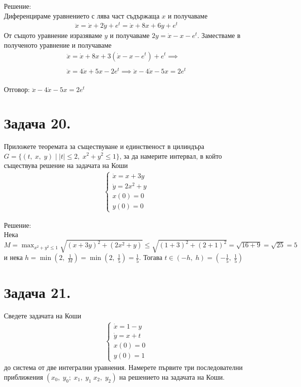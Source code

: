 \documentclass[a4paper, 12pt, oneside]{article}
\begin{document}
Решение: \\

Диференцираме уравнението с лява част съдържаща $x$ и получаваме
\begin{align*}
    \ddot{x} = \dot{x} + 2\dot{y} + e^t
    = \dot{x} + 8x + 6y + e^t
\end{align*}
От същото уравнение изразяваме $y$ и получаваме $2y = \dot{x} -x - e^t$.
Заместваме в полученото уравнение и получаваме
\begin{align*}
    \ddot{x} = \dot{x} + 8x + 3(\dot{x} -x - e^t) + e^t \implies \\\\
    \ddot{x} = 4\dot{x} + 5x - 2e^t \implies \ddot{x} - 4\dot{x} - 5x = 2e^t
\end{align*} \\

Отговор: $\ddot{x} - 4\dot{x} - 5x = 2e^t$ \\

\section{Задача 20.}
Приложете теоремата за съществуване и единственост в цилиндъра \\
$G = \{(t, \; x, \; y) \; | \; |t| \leq 2, \; x^2 + y^2 \leq 1\}$,
за да намерите интервал, в който съществува решение на задачата на Коши
\begin{align*}
    \begin{cases}
        \dot{x} = x + 3y \\
        \dot{y} = 2x^2 + y \\
        x(0) = 0 \\
        y(0) = 0
    \end{cases}
\end{align*}

Решение: \\

Нека $M = \displaystyle\max_{x^2 + y^2 \leq 1} \sqrt{(x + 3y)^2 + (2x^2 + y)} \leq \sqrt{(1 + 3)^2 + (2 + 1)^2} = \sqrt{16 + 9} = \sqrt{25} = 5$
и нека $h = \min\left(2, \; \frac{1}{M}\right) = \min\left(2, \; \frac{1}{5}\right) = \frac{1}{5}$.
Тогава $t \in (-h, \; h) = \left(-\frac{1}{5}, \; \frac{1}{5}\right)$

\section{Задача 21.}

Сведете задачата на Коши
\begin{align*}
    \begin{cases}
        \dot{x} = 1 - y \\
        \dot{y} = x + t \\
        x(0) = 0 \\
        y(0) = 1
    \end{cases}
\end{align*}
до система от две интегрални уравнения. Намерете първите три последователни
приближения $(x_0, \; y_0 ; \; x_1, \; y_1 \; x_2, \; y_2)$ на решението
на задачата на Коши. \\
\end{document}
